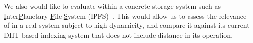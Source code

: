 \noindent We also would like to evaluate \NAME within a concrete
storage system such as \underline{I}nter\underline{P}lanetary
\underline{F}ile \underline{S}ystem
(IPFS)~\cite{henningsen2020mapping}. This would allow us to assess the
relevance of \NAME in a real system subject to high dynamicity, and
compare it against its current DHT-based indexing system that does not
include distance in its operation.



%





